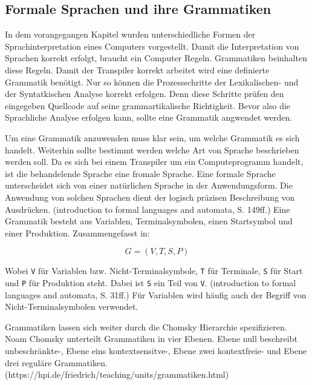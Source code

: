    
\subsection{Formale Sprachen und ihre Grammatiken}
In dem vorangegangen Kapitel wurden unterschiedliche Formen der Sprachinterpretation eines Computers vorgestellt. Damit die Interpretation von Sprachen korrekt erfolgt, braucht ein Computer Regeln. Grammatiken beinhalten diese Regeln. Damit der Transpiler korrekt arbeitet wird eine definierte Grammatik benötigt. Nur so können die Prozessschritte der Lexikalischen- und der Syntatkischen Analyse korrekt erfolgen. Denn diese Schritte prüfen den eingegeben Quellcode auf seine grammartikalische Richtigkeit. Bevor also die Sprachliche Analyse erfolgen kann, sollte eine Grammatik angwendet werden.
	
Um eine Grammatik anzuwenden muss klar sein, um welche Grammatik es sich handelt. Weiterhin sollte bestimmt werden welche Art von Sprache beschrieben werden soll. 
Da es sich bei einem Transpiler um ein Computeprogramm handelt, ist die behandelende Sprache eine fromale Sprache. Eine formale Sprache unterscheidet sich von einer natürlichen Sprache in der Anwendungsform. Die Anwendung von solchen Sprachen dient der logisch präzisen Beschreibung von Ausdrücken. (introduction to formal languages and automata, S. 149ff.) Eine Grammatik besteht aus Variablen, Terminalsymbolen, einen Startsymbol und einer Produktion. Zusammengefasst in:

\begin{center}
\begin{equation}
G=(V,T,S,P)
\end{equation}
\end{center}

Wobei \verb+V+ für Variablen bzw. Nicht-Terminalsymbole, \verb+T+ für Terminale, \verb+S+ für Start und \verb+P+ für Produktion steht. Dabei ist \verb+S+ ein Teil von \verb+V+. (introduction to formal languages and automata, S. 31ff.) Für Variablen wird häufig auch der Begriff von Nicht-Terminalsymbolen verwendet.

Grammatiken lassen sich weiter durch die Chomsky Hierarchie spezifizieren. Noam Chomsky unterteilt Grammatiken in vier Ebenen. Ebene null beschreibt unbeschränkte-, Ebene eins kontextsensitve-, Ebene zwei kontextfreie- und Ebene drei reguläre Grammatiken.(https://hpi.de/friedrich/teaching/units/grammatiken.html) 

